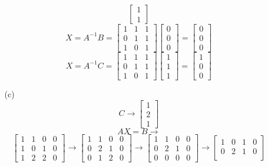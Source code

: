 \begin{itemize}
\begin{itemize}
$$\begin{bmatrix}
1 \\
1
\end{bmatrix}$$
$$X = A^{-1}B = \begin{bmatrix}
1 & 1 & 1 \\
0 & 1 & 1 \\
1 & 0 & 1
\end{bmatrix}\begin{bmatrix}
0 \\
0 \\
0
\end{bmatrix} = \begin{bmatrix}
0 \\
0 \\
0
\end{bmatrix}$$
$$X = A^{-1}C = \begin{bmatrix}
1 & 1 & 1 \\
0 & 1 & 1 \\
1 & 0 & 1
\end{bmatrix}\begin{bmatrix}
1 \\
1 \\
1
\end{bmatrix} = \begin{bmatrix}
1 \\
0 \\
0
\end{bmatrix}$$
\item[(c)]
$$C \rightarrow \begin{bmatrix}
1 \\
2 \\
1
\end{bmatrix}$$
$$AX = B \rightarrow$$
$$\begin{bmatrix}
1 & 1 & 0 & 0 \\
1 & 0 & 1 & 0 \\
1 & 2 & 2 & 0
\end{bmatrix} \rightarrow \begin{bmatrix}
1 & 1 & 0 & 0 \\
0 & 2 & 1 & 0 \\
0 & 1 & 2 & 0
\end{bmatrix} \rightarrow \begin{bmatrix}
1 & 1 & 0 & 0 \\
0 & 2 & 1 & 0 \\
0 & 0 & 0 & 0
\end{bmatrix} \rightarrow \begin{bmatrix}
1 & 0 & 1& 0 \\
0 & 2 & 1 & 0 \\

\end{bmatrix}$$
\end{itemize}
\end{itemize}
